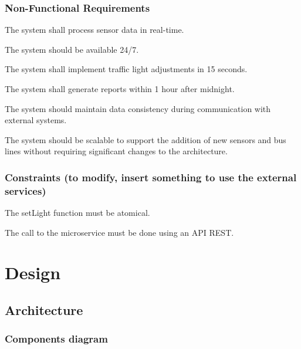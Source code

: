 \documentclass[12pt, a4paper, twoside, openright]{report}
\begin{document}
\subsection{Non-Functional Requirements}

\begin{non_functional_requirements}
\item
  The system shall process sensor data in real-time.
\item
  The system should be available 24/7.
\item
  The system shall implement traffic light adjustments in 15 seconds.
\item
  The system shall generate reports within 1 hour after midnight.
\item
  The system should maintain data consistency during communication with
  external systems.
\item
  The system should be scalable to support the addition of new sensors and bus lines 
  without requiring significant changes to the architecture.
\end{non_functional_requirements}

\subsection{Constraints (to modify, insert something to use the
external services)}

\begin{constraints}
\item
  The setLight function must be atomical.
\item
  The call to the microservice must be done using an API REST.
\end{constraints}

\chapter{Design}

\section{Architecture}
\subsection{Components diagram}
\end{document}
